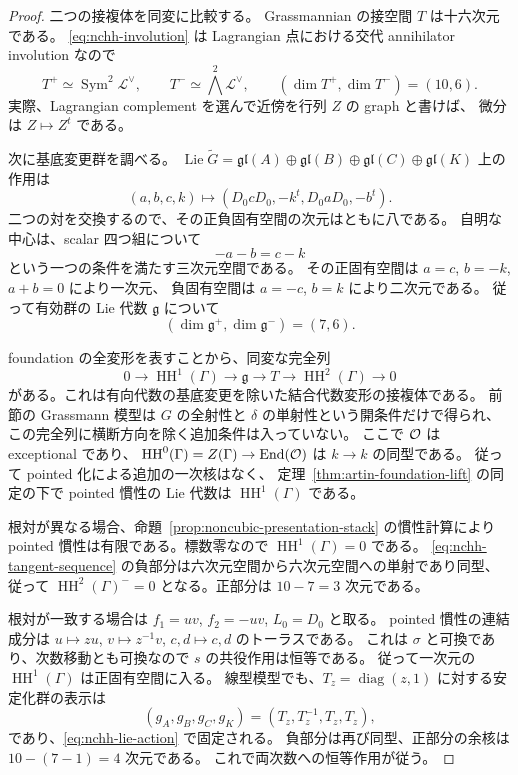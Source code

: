 \begin{proof}
二つの接複体を同変に比較する。
Grassmannian の接空間 $T$ は十六次元である。
\eqref{eq:nchh-involution} は Lagrangian 点における交代 annihilator involution なので
\[
T^+\simeq\operatorname{Sym}^2\mathscr L^{\vee},\qquad
T^-\simeq\bigwedge^2\mathscr L^{\vee},\qquad
(\dim T^+,\dim T^-)=(10,6).
\]
実際、Lagrangian complement を選んで近傍を行列 $Z$ の graph と書けば、
微分は $Z\mapsto Z^t$ である。

次に基底変更群を調べる。
$\operatorname{Lie}\widetilde G=\mathfrak{gl}(A)\oplus\mathfrak{gl}(B)
\oplus\mathfrak{gl}(C)\oplus\mathfrak{gl}(K)$ 上の作用は
\begin{equation}\label{eq:nchh-lie-action}
(a,b,c,k)\longmapsto
(D_0cD_0,-k^t,D_0aD_0,-b^t).
\end{equation}
二つの対を交換するので、その正負固有空間の次元はともに八である。
自明な中心は、scalar 四つ組について
\[
-a-b=c-k
\]
という一つの条件を満たす三次元空間である。
その正固有空間は $a=c$, $b=-k$, $a+b=0$ により一次元、
負固有空間は $a=-c$, $b=k$ により二次元である。
従って有効群の Lie 代数 $\mathfrak g$ について
\begin{equation}\label{eq:nchh-lie-dim}
(\dim\mathfrak g^+,\dim\mathfrak g^-)=(7,6).
\end{equation}

foundation の全変形を表すことから、同変な完全列
\begin{equation}\label{eq:nchh-tangent-sequence}
0\longrightarrow\operatorname{HH}^1(\Gamma)\longrightarrow\mathfrak g
 \longrightarrow T\longrightarrow\operatorname{HH}^2(\Gamma)\longrightarrow0
\end{equation}
がある。これは有向代数の基底変更を除いた結合代数変形の接複体である。
前節の Grassmann 模型は $G$ の全射性と $\delta$ の単射性という開条件だけで得られ、
この完全列に横断方向を除く追加条件は入っていない。
ここで $\mathcal O$ は exceptional であり、
$\operatorname{HH}^0(\Gamma)=Z(\Gamma)\to\operatorname{End}(\mathcal O)$ は $k\to k$ の同型である。
従って pointed 化による追加の一次核はなく、
定理~\ref{thm:artin-foundation-lift} の同定の下で
pointed 慣性の Lie 代数は $\operatorname{HH}^1(\Gamma)$ である。

根対が異なる場合、命題~\ref{prop:noncubic-presentation-stack} の慣性計算により
pointed 慣性は有限である。標数零なので $\operatorname{HH}^1(\Gamma)=0$ である。
\eqref{eq:nchh-tangent-sequence} の負部分は六次元空間から六次元空間への単射であり同型、
従って $\operatorname{HH}^2(\Gamma)^-=0$ となる。正部分は $10-7=3$ 次元である。

根対が一致する場合は $f_1=uv$, $f_2=-uv$, $L_0=D_0$ と取る。
pointed 慣性の連結成分は
$u\mapsto zu$, $v\mapsto z^{-1}v$, $c,d\mapsto c,d$ のトーラスである。
これは $\sigma$ と可換であり、次数移動とも可換なので $s$ の共役作用は恒等である。
従って一次元の $\operatorname{HH}^1(\Gamma)$ は正固有空間に入る。
線型模型でも、$T_z=\operatorname{diag}(z,1)$ に対する安定化群の表示は
\[
(g_A,g_B,g_C,g_K)=(T_z,T_z^{-1},T_z,T_z),
\]
であり、\eqref{eq:nchh-lie-action} で固定される。
負部分は再び同型、正部分の余核は $10-(7-1)=4$ 次元である。
これで両次数への恒等作用が従う。
\end{proof}

